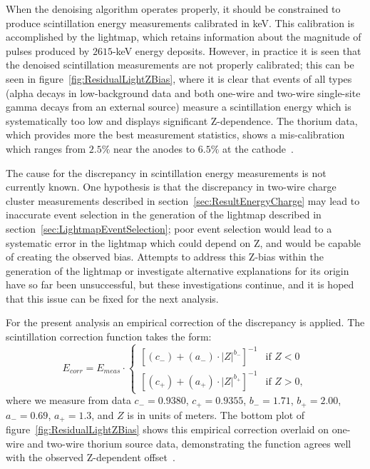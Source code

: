 When the denoising algorithm operates properly, it should be constrained to produce scintillation energy measurements calibrated in keV.  This calibration is accomplished by the lightmap, which retains information about the magnitude of pulses produced by $2615$-keV energy deposits.  However, in practice it is seen that the denoised scintillation measurements are not properly calibrated; this can be seen in figure~\ref{fig:ResidualLightZBias}, where it is clear that events of all types (alpha decays in low-background data and both one-wire and two-wire single-site gamma decays from an external source) measure a scintillation energy which is systematically too low and displays significant Z-dependence.  The thorium data, which provides more the best measurement statistics, shows a mis-calibration which ranges from $2.5\%$ near the anodes to $6.5\%$ at the cathode~\cite{EnergyDocumentRun2ab}.

The cause for the discrepancy in scintillation energy measurements is not currently known.  One hypothesis is that the discrepancy in two-wire charge cluster measurements described in section~\ref{sec:ResultEnergyCharge} may lead to inaccurate event selection in the generation of the lightmap described in section~\ref{sec:LightmapEventSelection}; poor event selection would lead to a systematic error in the lightmap which could depend on Z, and would be capable of creating the observed bias.  Attempts to address this Z-bias within the generation of the lightmap or investigate alternative explanations for its origin have so far been unsuccessful, but these investigations continue, and it is hoped that this issue can be fixed for the next analysis.

For the present analysis an empirical correction of the discrepancy is applied.  The scintillation correction function takes the form:
\begin{equation}
E_{corr} = E_{meas}\cdot \begin{cases}
\left[ (c_{-}) + (a_{-})\cdot |Z|^{b_{-}} \right]^{-1} & \text{if } Z < 0\\
\left[ (c_{+}) + (a_{+})\cdot |Z|^{b_{+}} \right]^{-1} & \text{if } Z > 0,
\end{cases}\end{equation}
where we measure from data $c_{-} = 0.9380$, $c_{+} = 0.9355$, $b_{-} = 1.71$, $b_{+} = 2.00$, $a_{-} = 0.69$, $a_{+} = 1.3$, and $Z$ is in units of meters.  The bottom plot of figure~\ref{fig:ResidualLightZBias} shows this empirical correction overlaid on one-wire and two-wire thorium source data, demonstrating the function agrees well with the observed Z-dependent offset~\cite{EnergyDocumentRun2ab}.

